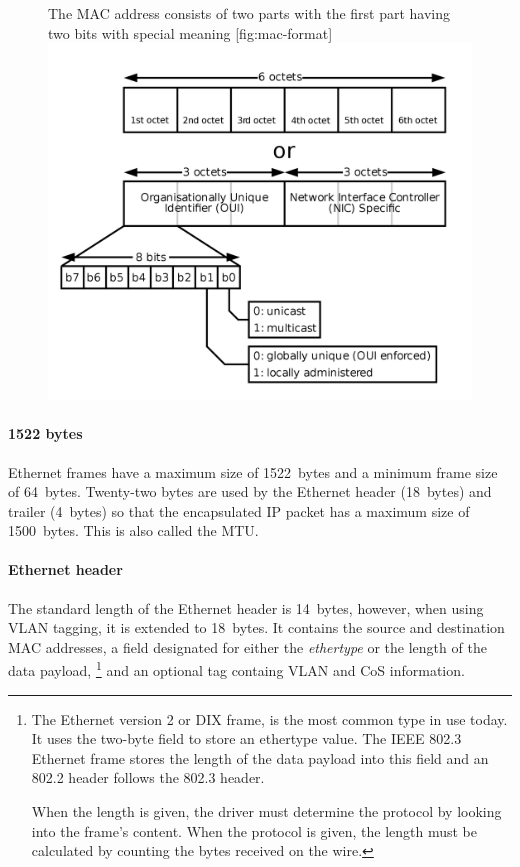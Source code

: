 \begin{figure}
\begin{sidecaption}%
   [The format of a \acs{MAC} address]%
   {The \acs{MAC} address consists of two parts with the first part having two bits with special meaning}%
   [fig:mac-format]
\centering
\includegraphics[width=\textwidth]{images/ethernet/mac-address-format.png}
\end{sidecaption}
\end{figure}

\paragraph{1522 bytes}
Ethernet frames have a maximum size of 1522~bytes and a minimum frame size of 64~bytes.
Twenty-two bytes are used by the Ethernet header (18~bytes) and trailer (4~bytes) so that the encapsulated \acs{IP} packet has a maximum size of 1500~bytes.
This is also called the \acf{MTU}.


\paragraph{Ethernet header}
The standard length of the Ethernet header is 14~bytes, however, when using \acs{VLAN} tagging, it is extended to 18~bytes.
It contains the source and destination \acs{MAC} addresses, a field designated for either the \emph{ethertype} or the length of the data payload,%
   \footnote{%
      The Ethernet version 2 or \acs{DIX} frame, is the most common type in use today.
      It uses the two-byte field to store an ethertype value.
      The \acs{IEEE} 802.3 Ethernet frame stores the length of the data payload into this field and an 802.2  header follows the 802.3 header.

      When the length is given, the driver must determine the protocol by looking into the frame's content.
      When the protocol is given, the length must be calculated by counting the bytes received on the wire.
   }
and an optional  tag containg \acs{VLAN} and \acs{CoS} information.

